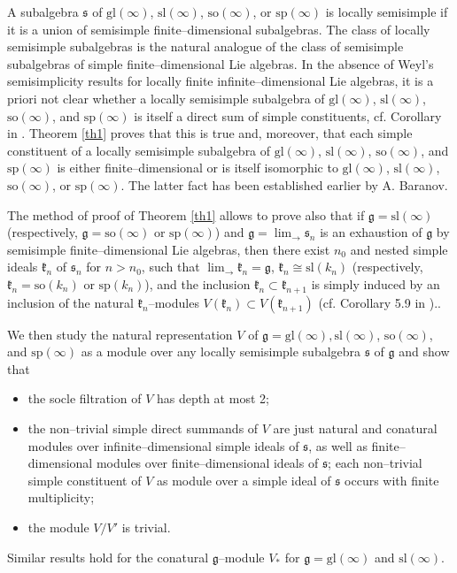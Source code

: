 \documentclass[oneside,leqno,12pt]{article}
\def\gg{\mathfrak{g}}
\def\gk{\mathfrak{k}}
\def\gs{\mathfrak{s}}
\renewcommand{\ss}{\mathfrak{s}}
\renewcommand{\gg}{\mathfrak{g}}
\renewcommand{\sp}{\mathrm{sp}}
\newcommand{\gl}{\mathrm{gl}}
\renewcommand{\sl}{\mathrm{sl}}
\newcommand{\so}{\mathrm{so}}
\newcommand{\inj}{\displaystyle \lim_\to}
\begin{document}
A subalgebra $\gs$ of $\gl(\infty)$, $\sl(\infty)$, $\so(\infty)$, or $\sp(\infty)$ is locally semisimple if it is
a union of  
 semisimple finite--dimensional subalgebras.  The class of locally semisimple subalgebras is the natural analogue of the class of 
semisimple subalgebras of simple finite--dimensional Lie algebras. In the absence of Weyl's semisimplicity results 
for locally finite infinite--dimensional Lie algebras, it is a priori not clear whether a locally semisimple subalgebra 
of $\gl(\infty)$, $\sl(\infty)$, $\so(\infty)$, and $\sp(\infty)$ is itself a direct sum of simple constituents, cf. Corollary  in \cite{LP}. Theorem \ref{th1} proves 
that this is true and, moreover, that each simple constituent of a locally semisimple subalgebra 
of $\gl(\infty)$, $\sl(\infty)$, $\so(\infty)$, and $\sp(\infty)$ is either finite--dimensional or is itself isomorphic to 
$\gl(\infty)$, $\sl(\infty)$, $\so(\infty)$, or $\sp(\infty)$. The latter fact has been established earlier by A. Baranov.

The method of proof of Theorem \ref{th1} allows to prove also that if $\gg=\sl(\infty)$ (respectively, $\gg=\so(\infty)$ 
or $\sp(\infty)$) and $\gg=\inj \gs_n$ is an exhaustion of $\gg$ by semisimple finite--dimensional Lie algebras, then 
there exist $n_0$ and nested simple ideals  $\gk_n$ of  $\gs_n$  for $n > n_0$, such that 
$\inj \gk_n = \gg$,  $\gk_n \cong \sl(k_n)$ (respectively, $\gk_n=\so(k_n)$ or $\sp(k_n)$),
 and the inclusion $\gk_n\subset\gk_{n+1}$ is simply induced by an inclusion of the natural $\gk_n$--modules 
 $V(\gk_n)\subset V(\gk_{n+1})$ (cf. Corollary 5.9 in \cite{Ba2}).. 

We then study the natural representation $V$ of $\gg= \gl(\infty), \sl(\infty)$, $\so(\infty)$, and $\sp(\infty)$ as a module over any 
locally semisimple subalgebra $\ss$ of $\gg$ and show that 
\begin{itemize}
\item the socle filtration of $V$ has depth  at most 2;
\item the non--trivial simple direct summands of $V$ are just natural and conatural modules over infinite--dimensional
simple ideals of $\gs$, as well as 
finite--dimensional modules over finite--dimensional ideals 
of $\gs$; each non--trivial simple constituent of $V$ as module over a simple ideal of $\gs$ occurs with finite multiplicity;
\item the module $V/V'$ is trivial. 
\end{itemize}
Similar results hold for the conatural $\gg$--module $V_*$ for $\gg = \gl(\infty)$ and $\sl(\infty)$.  
\end{document}
